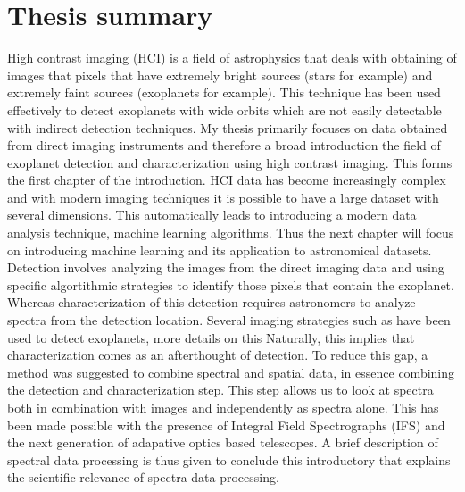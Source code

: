\chapter*{Thesis summary}
High contrast imaging (HCI) is a field of astrophysics that deals with obtaining of images that pixels that have extremely bright sources (stars for example) and extremely faint sources (exoplanets for example).
This technique has been used effectively to detect exoplanets with wide orbits which are not easily detectable with indirect detection techniques.
My thesis primarily focuses on data obtained from direct imaging instruments and therefore a broad introduction the field of exoplanet detection and characterization\@
using high contrast imaging.
This forms the first chapter of the introduction.
HCI data has become increasingly complex and with modern imaging techniques it is possible to have a large dataset with several dimensions.
This automatically leads to introducing a modern data analysis technique, machine learning algorithms.
Thus the next chapter will focus on introducing machine learning and its application to astronomical datasets.
Detection involves analyzing the images from the direct imaging data and using specific algortithmic strategies to identify those pixels that contain the exoplanet.
Whereas characterization of this detection requires astronomers to analyze spectra from the detection location.
Several imaging strategies such as \citep[ADI, ][]{2006MaroisADI} have been used to detect exoplanets, more details on this 
Naturally, this implies that characterization comes as an afterthought of detection.
To reduce this gap, a method was suggested to combine spectral and spatial data, in essence combining the detection 
and characterization step.
This step allows us to look at spectra both in combination with images and independently as spectra alone.
This has been made possible with the presence of Integral Field Spectrographs (IFS) and the next generation of adapative optics based 
telescopes.
A brief description of spectral data processing is thus given to conclude this introductory that explains the scientific relevance of spectra data processing.

